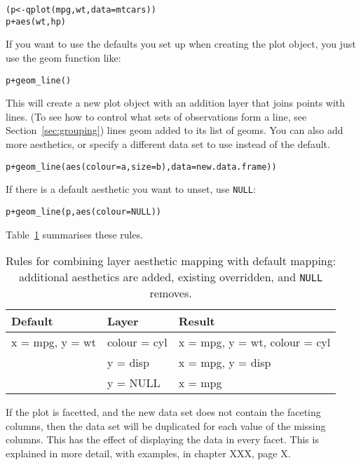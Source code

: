 \begin{alltt}
(p <- qplot(mpg, wt, data=mtcars))
p + aes(wt, hp)
\end{alltt}

If you want to use the defaults you set up when creating the plot object, you just use the geom function like:

\begin{alltt}
p + geom_line()
\end{alltt}

This will create a new plot object with an addition layer that joins points with lines.  (To see how to control what sets of observations form a line, see Section~\ref{sec:grouping}) lines geom added to its list of geoms.   You can also add more aesthetics, or specify a different data set to use instead of the default.  

\begin{alltt}
p + geom_line(aes(colour=a, size=b), data=new.data.frame))
\end{alltt}

If there is a default aesthetic you want to unset, use {\tt NULL}:

\begin{alltt}
p + geom_line(p, aes(colour=NULL))
\end{alltt}

Table~\ref{tbl:aes-override} summarises these rules.

\begin{table}
  \begin{center}
  \begin{tabular}{lll}
    \toprule
    Default & Layer  & Result \\
    \midrule
    x = mpg, y = wt & colour = cyl & x = mpg, y = wt, colour = cyl \\
                    & y = disp & x = mpg, y = disp \\
                    & y = NULL & x = mpg \\
    \bottomrule
  \end{tabular}
  \end{center}
  \caption{Rules for combining layer aesthetic mapping with default mapping:  additional aesthetics are added, existing overridden, and {\tt NULL} removes.}
  \label{tbl:aes-override}
\end{table}

If the plot is facetted, and the new data set does not contain the faceting columns, then the data set will be duplicated for each value of the missing columns.  This has the effect of displaying the data in every facet.  This is explained in more detail, with examples, in chapter XXX, page X.

